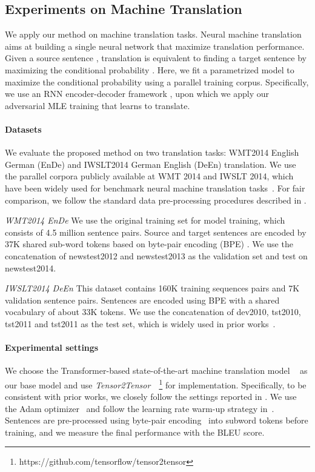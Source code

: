 \documentclass{article}
\begin{document}
\subsection{Experiments on Machine Translation}
We apply our method on machine translation tasks. Neural machine translation aims at building a single neural network
that maximize translation performance. 
Given a source sentence , translation is equivalent to finding a target 
sentence  by maximizing the conditional probability .
Here, we fit a parametrized model to maximize the conditional probability
using a parallel training corpus. Specifically, we use an RNN encoder-decoder framework \citep{cho2014learning, gehring2017convolutional, vaswani2017attention}, upon which we apply 
our adversarial MLE training that learns to translate. 




\paragraph{Datasets} 
We evaluate the proposed method on two translation tasks:
WMT2014 English  German (EnDe) and IWSLT2014 German  English (DeEn) translation. 
We use the parallel corpora publicly available at WMT 2014  and IWSLT 2014, 
which have been widely used for benchmark neural machine translation tasks~\cite{vaswani2017attention,gehring2017convolutional}. 
For fair comparison, we follow the standard data pre-processing procedures described in \citet{ranzato2015sequence, bahdanau2016actor}.


\noindent\emph{WMT2014 EnDe}
We use the original training set for model training, which consists of 
4.5 million sentence pairs. Source and target sentences are encoded by 
37K shared sub-word tokens based on byte-pair encoding (BPE) \citep{sennrich2015neural}.
We use the concatenation of newstest2012 and newstest2013 
as the validation set and test on newstest2014. 

\noindent\emph{IWSLT2014 DeEn}
This dataset contains 160K training sequences pairs and 7K validation sentence
pairs. Sentences are encoded using BPE with a shared vocabulary of about 33K tokens.
We use the concatenation of dev2010, tst2010, tst2011 and tst2011 as the test set, which is widely used in prior works~\citep{bahdanau2016actor}.

\paragraph{Experimental settings}
We choose the Transformer-based state-of-the-art machine translation model 
~\citep{vaswani2017attention} 
as our base model and use \textit{Tensor2Tensor}~\citep{tensor2tensor}~\footnote{https://github.com/tensorflow/tensor2tensor}
for implementation.
Specifically, 
to be consistent with prior works,
we closely follow the settings reported in \citet{vaswani2017attention}.
We use the Adam optimizer~\cite{kingma2014adam}
and follow the learning rate warm-up strategy in~\citet{vaswani2017attention}.
Sentences are pre-processed using byte-pair encoding~\citep{BPE} into subword tokens before training, 
and we measure the final performance with the BLEU score.
\end{document}
